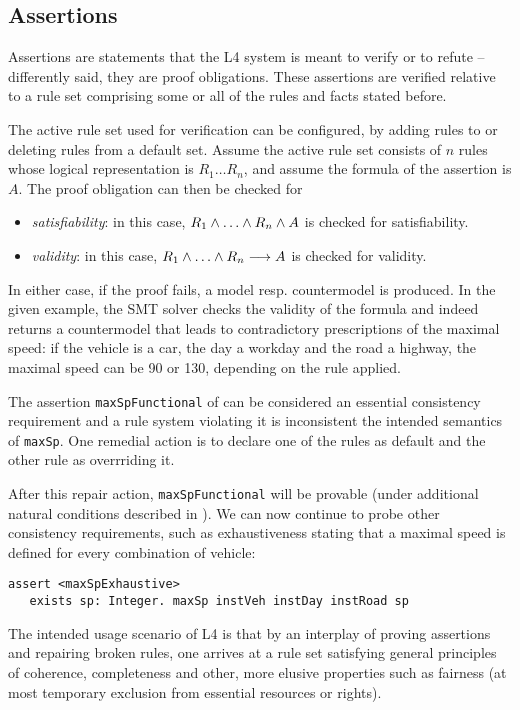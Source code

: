 \subsection{Assertions}\label{sec:assertions}


Assertions are statements that the L4 system is meant to verify or to
refute -- differently said, they are proof obligations. These assertions are verified
relative to a rule set comprising some or all of the rules and facts stated
before. 


The active rule set used for verification can be configured, by adding rules
to or deleting rules from a default set. Assume the active rule set consists
of $n$ rules whose logical representation is $R_1 \dots R_n$, and assume the
formula of the assertion is $A$. The proof obligation can then be checked for
\begin{itemize}
\item  \emph{satisfiability}: in this case, $R_1 \AND \dots \AND R_n \AND A$
  is checked for satisfiability.
\item \emph{validity}: in this case, $R_1 \AND \dots \AND R_n \IMPL A$ is
  checked for validity.
\end{itemize}
In either case, if the proof fails, a model resp.{} countermodel is produced.
In the given example, the SMT solver checks the validity of the formula and
indeed returns a countermodel that leads to contradictory prescriptions of the
maximal speed: if the vehicle is a car, the day a workday and the road a
highway, the maximal speed can be 90 or 130, depending on the rule applied.


The assertion \texttt{maxSpFunctional} of  can be considered an essential
consistency requirement and a rule system violating it is inconsistent \wrt{} the intended semantics of \texttt{maxSp}. One
remedial action is to declare one of the rules as default and the other rule
as overrriding it.

After this repair action, \texttt{maxSpFunctional} will be provable (under
additional natural conditions described in ). We can now
continue to probe other consistency requirements, such as exhaustiveness
stating that a maximal speed is defined for every combination of vehicle:

\begin{lstlisting}
assert <maxSpExhaustive>
   exists sp: Integer. maxSp instVeh instDay instRoad sp
\end{lstlisting}

The intended usage scenario of L4 is that by an interplay of proving
assertions and repairing broken rules, one arrives at a rule set satisfying
general principles of coherence, completeness and other, more elusive
properties such as fairness (at most temporary exclusion from essential
resources or rights).


